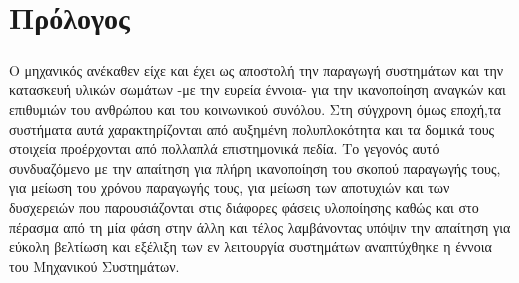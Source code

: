 \documentclass[a4paper,12pt,twoside]{report}
\begin{document}
\newpage
{}
\setlength{\parskip}{0ex plus 0.5ex minus 0.2ex}
\tableofcontents

\newpage
{}
{}
\listoffigures

\newpage
{}
{}
\listoftables




\setlength{\parskip}{1.3ex plus 0.2ex minus 0.2ex}



\makeatletter
	\def\cleardoublepage{
		\clearpage\if@twoside \ifodd\c@page\else
	    \hbox{}
	    \thispagestyle{plain}
	    \newpage
    	\if@twocolumn\hbox{}\newpage\fi\fi\fi
    }
\makeatother \clearpage{\pagestyle{plain}\cleardoublepage}

\pagestyle{fancy}
\fancyhf{}
\renewcommand{\chaptermark}[1]{\markboth{ \emph{#1}}{}}

\fancyhead[RE]{\leftmark}
\fancyfoot[LE,RO]{\thepage}

	\newpage
	\chapter*{Πρόλογος}
	
		\paragraph{}{Ο μηχανικός ανέκαθεν είχε και έχει ως αποστολή την παραγωγή συστημάτων και την κατασκευή υλικών σωμάτων -με την ευρεία έννοια- για την ικανοποίηση αναγκών και επιθυμιών του  ανθρώπου και του κοινωνικού συνόλου. Στη σύγχρονη όμως εποχή,τα συστήματα αυτά χαρακτηρίζονται από αυξημένη πολυπλοκότητα και τα δομικά τους στοιχεία προέρχονται από πολλαπλά επιστημονικά πεδία. Το γεγονός αυτό συνδυαζόμενο με την απαίτηση για πλήρη ικανοποίηση του σκοπού παραγωγής τους, για μείωση του χρόνου παραγωγής τους, για μείωση των αποτυχιών και των δυσχερειών που παρουσιάζονται στις διάφορες φάσεις υλοποίησης καθώς και στο πέρασμα από τη μία φάση στην άλλη και τέλος λαμβάνοντας υπόψιν την απαίτηση για εύκολη βελτίωση και εξέλιξη των εν λειτουργία συστημάτων αναπτύχθηκε η έννοια του Μηχανικού Συστημάτων.
		}
\end{document}
